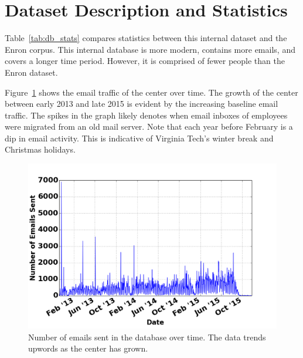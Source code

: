 \documentclass[12pt]{report}
\begin{document}
\section{Dataset Description and Statistics}
Table~\ref{tab:db_stats} compares statistics between this internal dataset and the Enron corpus.
This internal database is more modern, contains more emails, and covers a longer time period.
However, it is comprised of fewer people than the Enron dataset.

\begin{table}[t]
\centering
\caption{A comparison between the internal dataset and the Enron email corpus.}
\label{tab:db_stats}
\end{table}

Figure~\ref{fig:emails_over_time} shows the email traffic of the center over time.
The growth of the center between early 2013 and late 2015 is evident by the increasing baseline email traffic.
The spikes in the graph likely denotes when email inboxes of employees were migrated from an old mail server.
Note that each year before February is a dip in email activity.
This is indicative of Virginia Tech's winter break and Christmas holidays.

\begin{figure}[t]
	\centering
	\includegraphics[width=\columnwidth,trim={0mm 0mm 0mm 0mm},clip]{emails_over_time}
	\caption[Center emails over time]{Number of emails sent in the database over time.  The data trends upwords as the center has grown.}
	\label{fig:emails_over_time}
\end{figure}
\end{document}
